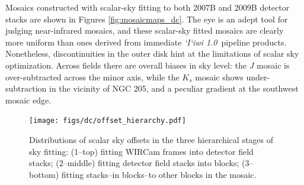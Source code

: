 \documentclass[iop]{emulateapj}
\newcommand{\sw}[1]{\textit{#1}} %
\newcommand{\iiwione}{\sw{`I`iwi 1.0}}
\begin{document}
Mosaics constructed with scalar-sky fitting to both 2007B and 2009B detector stacks are shown in Figures \ref{fig:mosaicmaps_dc}. The eye is an adept tool for judging near-infrared mosaics, and these scalar-sky fitted mosaics are clearly more uniform than ones derived from immediate \iiwione\ pipeline products. Nonetheless, discontinuities in the outer disk hint at the limitations of scalar sky optimization. Across fields there are overall biases in sky level: the $J$ mosaic is over-subtracted across the minor axis, while the $K_s$ mosaic shows under-subtraction in the vicinity of NGC 205, and a peculiar gradient at the southwest mosaic edge.


\begin{figure}[p]
    \centering
        \texttt{[image: figs/dc/offset\_hierarchy.pdf]}
    \caption[Distributions of scalar sky offsets in the three hierarchical stages of sky fitting]{Distributions of scalar sky offsets in the three hierarchical stages of sky fitting: (1--top) fitting WIRCam frames into detector field stacks;  (2--middle) fitting detector field stacks into blocks; (3--bottom) fitting stacks--in blocks--to other blocks in the mosaic.}
    \label{fig:offset_hierarchy}
\end{figure}
\end{document}
